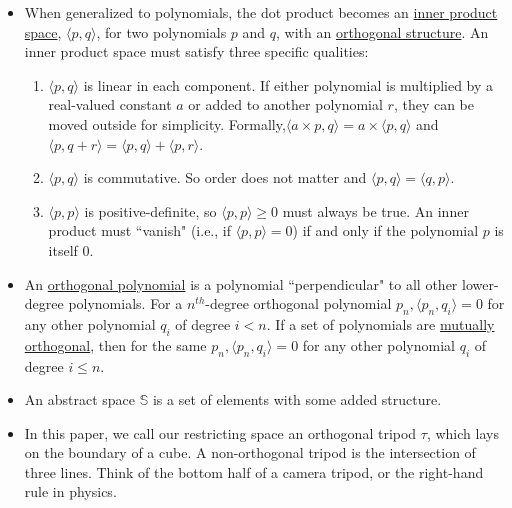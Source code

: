 \documentclass[letterpaper, 12pt]{article}
\begin{document}
\begin{itemize}
	\vspace*{-3mm}
	\item When generalized to polynomials, the dot product becomes an \underline{inner product space}, $\langle p, q \rangle$, for two polynomials $p$ and $q$, with an \underline{orthogonal structure}. An inner product space must satisfy three specific qualities:
		\vspace*{-3mm}
		\begin{enumerate}
			\vspace*{-1mm}
			\item $\langle p, q \rangle$ is linear in each component. If either polynomial is multiplied by a real-valued constant $a$ or added to another polynomial $r$, they can be moved outside for simplicity. Formally,$\langle a \times p, q\rangle = a \times \langle p, q\rangle$ and $\langle p, q + r\rangle = \langle p, q\rangle + \langle p, r\rangle$.
			\vspace*{-1mm}
			\item $\langle p, q \rangle$ is commutative. So order does not matter and $\langle p, q \rangle = \langle q, p \rangle$.
			\vspace*{-1mm}
			\item $\langle p, p \rangle$ is positive-definite, so $\langle p, p \rangle \geq 0$ must always be true. An inner product must ``vanish" (i.e., if $\langle p, p \rangle = 0$) if and only if the polynomial $p$ is itself $0$.
		\end{enumerate}
				
	\vspace*{-4mm}
	\item An \underline{orthogonal polynomial} is a polynomial ``perpendicular" to all other lower-degree polynomials. For a $n^{th}$-degree orthogonal polynomial $p_n, \langle p_n, q_i\rangle = 0$ for any other polynomial $q_i$ of degree $i < n$. If a set of polynomials are \underline{mutually orthogonal}, then for the same $p_n, \langle p_n, q_i\rangle = 0$ for any other polynomial $q_i$ of degree $i \leq n$.
				
	\vspace*{-3mm}
	\item An abstract space $\mathbb{S}$ is a set of elements with some added structure.
				
	\vspace*{-3mm}
	\item In this paper, we call our restricting space an orthogonal tripod $\tau$, which lays on the boundary of a cube. A non-orthogonal tripod is the intersection of three lines. Think of the bottom half of a camera tripod, or the right-hand rule in physics.
				

\end{itemize}
\end{document}
